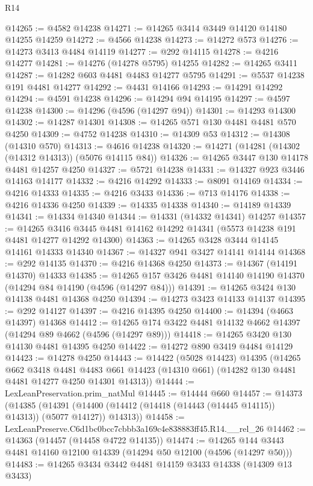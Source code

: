 \begin{lexlean}{R14}
\begin{coremodule}
@14265 := @4582 @14238
@14271 := @14265 @3414 @3449 @14120 @14180 @14255 @14259
@14272 := @4566 @14238
@14273 := @14272 @573
@14276 := @14273 @3413 @4484 @14119
@14277 := @292 @14115
@14278 := @4216 @14277
@14281 := @14276 (@14278 @5795) @14255
@14282 := @14265 @3411
@14287 := @14282 @603 @4481 @4483 @14277 @5795
@14291 := @5537 @14238 @191 @4481 @14277
@14292 := @4431 @14166
@14293 := @14291 @14292
@14294 := @4591 @14238
@14296 := @14294 @94 @14195
@14297 := @4597 @14238
@14300 := @14296 (@4596 (@14297 @94))
@14301 := @14293 @14300
@14302 := @14287 @14301
@14308 := @14265 @571 @130 @4481 @4481 @570 @4250
@14309 := @4752 @14238
@14310 := @14309 @53
@14312 := @14308 (@14310 @570)
@14313 := @4616 @14238
@14320 := @14271 (@14281 (@14302 (@14312 @14313)) (@5076 @14115 @84))
@14326 := @14265 @3447 @130 @14178 @4481 @14257 @4250
@14327 := @5721 @14238
@14331 := @14327 @923 @3446 @14163 @14177
@14332 := @4216 @14292
@14333 := @8091 @14169
@14334 := @4216 @14333
@14335 := @4216 @3433
@14336 := @713 @14176
@14338 := @4216 @14336 @4250
@14339 := @14335 @14338
@14340 := @14189 @14339
@14341 := @14334 @14340
@14344 := @14331 (@14332 @14341) @14257
@14357 := @14265
    @3416
    @3445
    @4481
    @14162
    @14292
    @14341
    (@5573 @14238 @191 @4481 @14277 @14292 @14300)
@14363 := @14265 @3428 @3444 @14145 @14161 @14333 @14340
@14367 := @14327 @941 @3427 @14141 @14144
@14368 := @292 @14135
@14370 := @4216 @14368 @4250
@14373 := @14367 (@14191 @14370) @14333
@14385 := @14265 @157 @3426 @4481 @14140 @14190 @14370 (@14294 @84 @14190 (@4596 (@14297 @84)))
@14391 := @14265 @3424 @130 @14138 @4481 @14368 @4250
@14394 := @14273 @3423 @14133 @14137
@14395 := @292 @14127
@14397 := @4216 @14395 @4250
@14400 := @14394 (@4663 @14397) @14368
@14412 := @14265 @174 @3422 @4481 @14132 @4662 @14397 (@14294 @89 @4662 (@4596 (@14297 @89)))
@14418 := @14265 @3420 @130 @14130 @4481 @14395 @4250
@14422 := @14272 @890 @3419 @4484 @14129
@14423 := @14278 @4250
@14443 := @14422
    (@5028 @14423)
    @14395
    (@14265
      @662
      @3418
      @4481
      @4483
      @661
      @14423
      (@14310 @661)
      (@14282 @130 @4481 @4481 @14277 @4250 @14301 @14313))
@14444 := LexLeanPreservation.prim_natMul
@14445 := @14444 @660
@14457 := @14373
    (@14385
      (@14391 (@14400 (@14412 (@14418 (@14443 (@14445 @14115)) @14313)) (@5077 @14127)) @14313))
@14458 := LexLeanPreserve.C6d1bc0bcc7cbbb3a169c4e838883ff45.R14.__rel_26
@14462 := @14363 (@14457 (@14458 @4722 @14135))
@14474 := @14265 @144 @3443 @4481 @14160 @12100 @14339 (@14294 @50 @12100 (@4596 (@14297 @50)))
@14483 := @14265 @3434 @3442 @4481 @14159 @3433 @14338 (@14309 @13 @3433)

\end{coremodule}
\end{lexlean}
